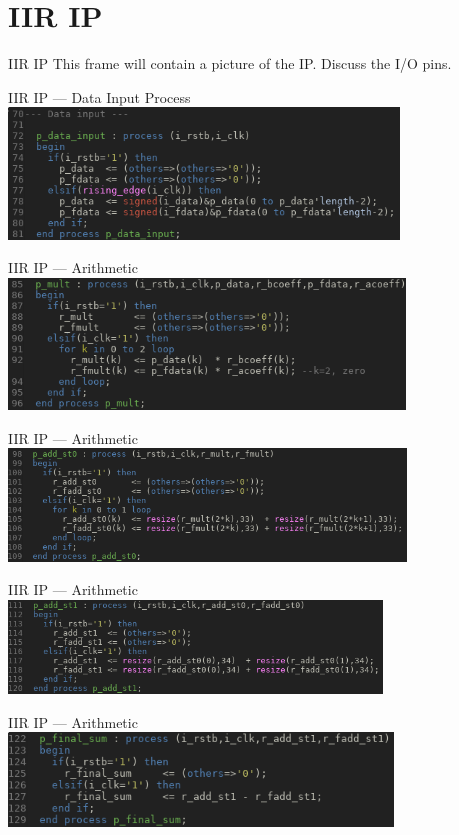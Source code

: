 \documentclass{beamer}
\begin{document}
\section{IIR IP}
\begin{frame}{IIR IP}
  This frame will contain a picture of the IP. Discuss the I/O pins.
\end{frame}
\begin{frame}{IIR IP --- Data Input Process }
  \includegraphics[height=3.5cm]
                  {data-input.png}
\end{frame}
\begin{frame}{IIR IP --- Arithmetic}
  \includegraphics[height=3.5cm]
                  {mult.png}
\end{frame}
\begin{frame}{IIR IP --- Arithmetic}
  \includegraphics[height=3cm]
                  {add0.png}
\end{frame}
\begin{frame}{IIR IP --- Arithmetic}
  \includegraphics[height=2.5cm]
                  {add1.png}
\end{frame}
\begin{frame}{IIR IP --- Arithmetic}
  \includegraphics[height=2.5cm]
                  {final-add.png}
\end{frame}
\end{document}
